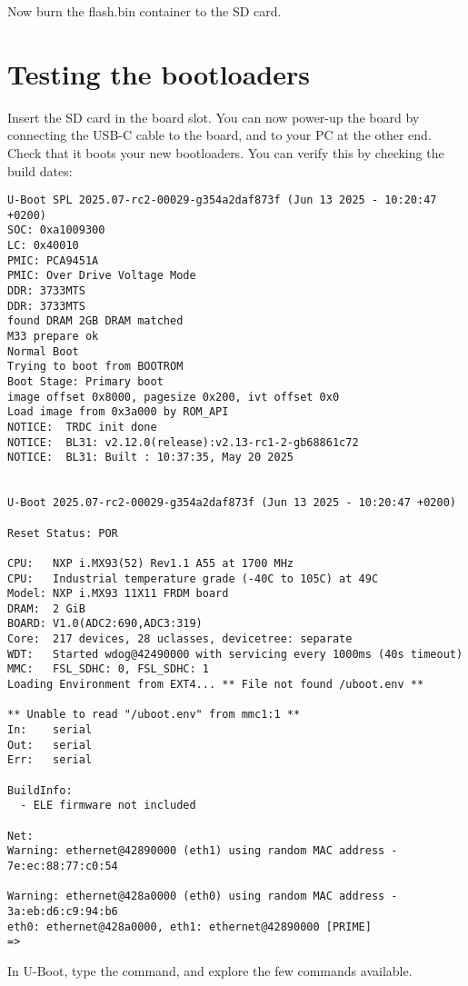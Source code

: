Now burn the flash.bin container to the SD card.

\section{Testing the bootloaders}

Insert the SD card in the board slot. You can now power-up the board
by connecting the USB-C cable to the board,  and
to your PC at the other end. Check that it boots your new bootloaders.
You can verify this by checking the build dates:

\begin{verbatim}
U-Boot SPL 2025.07-rc2-00029-g354a2daf873f (Jun 13 2025 - 10:20:47 +0200)
SOC: 0xa1009300
LC: 0x40010
PMIC: PCA9451A
PMIC: Over Drive Voltage Mode
DDR: 3733MTS
DDR: 3733MTS
found DRAM 2GB DRAM matched
M33 prepare ok
Normal Boot
Trying to boot from BOOTROM
Boot Stage: Primary boot
image offset 0x8000, pagesize 0x200, ivt offset 0x0
Load image from 0x3a000 by ROM_API
NOTICE:  TRDC init done
NOTICE:  BL31: v2.12.0(release):v2.13-rc1-2-gb68861c72
NOTICE:  BL31: Built : 10:37:35, May 20 2025


U-Boot 2025.07-rc2-00029-g354a2daf873f (Jun 13 2025 - 10:20:47 +0200)

Reset Status: POR 

CPU:   NXP i.MX93(52) Rev1.1 A55 at 1700 MHz
CPU:   Industrial temperature grade (-40C to 105C) at 49C
Model: NXP i.MX93 11X11 FRDM board
DRAM:  2 GiB
BOARD: V1.0(ADC2:690,ADC3:319)
Core:  217 devices, 28 uclasses, devicetree: separate
WDT:   Started wdog@42490000 with servicing every 1000ms (40s timeout)
MMC:   FSL_SDHC: 0, FSL_SDHC: 1
Loading Environment from EXT4... ** File not found /uboot.env **

** Unable to read "/uboot.env" from mmc1:1 **
In:    serial
Out:   serial
Err:   serial

BuildInfo:
  - ELE firmware not included

Net:   
Warning: ethernet@42890000 (eth1) using random MAC address - 7e:ec:88:77:c0:54

Warning: ethernet@428a0000 (eth0) using random MAC address - 3a:eb:d6:c9:94:b6
eth0: ethernet@428a0000, eth1: ethernet@42890000 [PRIME]
=> 
\end{verbatim}

In U-Boot, type the  command, and explore the few commands
available.

